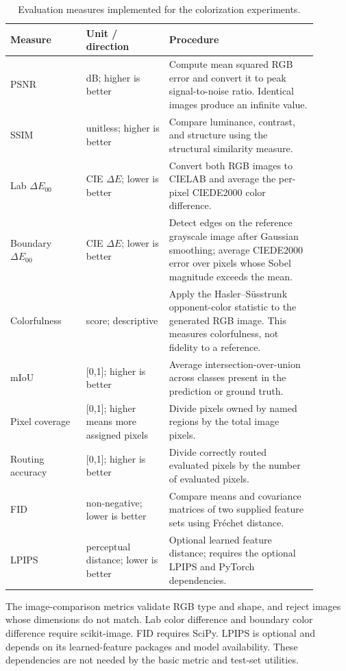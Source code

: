 \documentclass{FastFyp}
\begin{document}
\begin{table}[htbp]
\centering
\caption{Evaluation measures implemented for the colorization experiments.}
\label{tab:person-c-metrics}
\begin{tabular}{p{0.22\linewidth}p{0.24\linewidth}p{0.43\linewidth}}
\hline
Measure & Unit / direction & Procedure\\
\hline
PSNR & dB; higher is better & Compute mean squared RGB error and convert it to peak signal-to-noise ratio. Identical images produce an infinite value.\\
SSIM & unitless; higher is better & Compare luminance, contrast, and structure using the structural similarity measure.\\
Lab $\Delta E_{00}$ & CIE $\Delta E$; lower is better & Convert both RGB images to CIELAB and average the per-pixel CIEDE2000 color difference.\\
Boundary $\Delta E_{00}$ & CIE $\Delta E$; lower is better & Detect edges on the reference grayscale image after Gaussian smoothing; average CIEDE2000 error over pixels whose Sobel magnitude exceeds the mean.\\
Colorfulness & score; descriptive & Apply the Hasler--S\"usstrunk opponent-color statistic to the generated RGB image. This measures colorfulness, not fidelity to a reference.\\
mIoU & [0,1]; higher is better & Average intersection-over-union across classes present in the prediction or ground truth.\\
Pixel coverage & [0,1]; higher means more assigned pixels & Divide pixels owned by named regions by the total image pixels.\\
Routing accuracy & [0,1]; higher is better & Divide correctly routed evaluated pixels by the number of evaluated pixels.\\
FID & non-negative; lower is better & Compare means and covariance matrices of two supplied feature sets using Fr\'echet distance.\\
LPIPS & perceptual distance; lower is better & Optional learned feature distance; requires the optional LPIPS and PyTorch dependencies.\\
\hline
\end{tabular}
\end{table}

The image-comparison metrics validate RGB type and shape, and reject images
whose dimensions do not match. Lab color difference and boundary color
difference require scikit-image. FID requires SciPy. LPIPS is optional and
depends on its learned-feature packages and model availability. These
dependencies are not needed by the basic metric and test-set utilities.
\end{document}
